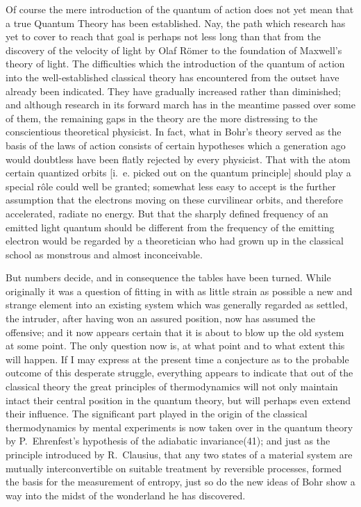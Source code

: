 \documentclass[12pt,oneside]{book}
\begin{document}
Of course the mere introduction of the quantum of action
does not yet mean that a true Quantum Theory has been
established. Nay, the path which research has yet to cover
to reach that goal is perhaps not less long than that from
the discovery of the velocity of light by Olaf R\"{o}mer to the
foundation of Maxwell's theory of light. The difficulties
which the introduction of the quantum of action into the
well-established classical theory has encountered from the
outset have already been indicated. They have gradually
increased rather than diminished; and although research
in its forward march has in the meantime passed over
some of them, the remaining gaps in the theory are the
more distressing to the conscientious theoretical physicist.
In fact, what in Bohr's theory served as the basis of the
laws of action consists of certain hypotheses which a generation
ago would doubtless have been flatly rejected by
every physicist. That with the atom certain quantized
orbits [i.~e. picked out on the quantum principle] should play
a special r\^{o}le could well be granted; somewhat less easy
to accept is the further assumption that the electrons
moving on these curvilinear orbits, and therefore accelerated,
radiate no energy. But that the sharply defined
frequency of an emitted light quantum should be different
from the frequency of the emitting electron would be regarded
by a theoretician who had grown up in the classical
school as monstrous and almost inconceivable.

But numbers decide, and in consequence the tables have
been turned. While originally it was a question of fitting
in with as little strain as possible a new and strange element
into an existing system which was generally regarded
as settled, the intruder, after having won an assured position,
now has assumed the offensive; and it now appears
certain that it is about to blow up the old system at some
point. The only question now is, at what point and to
what extent this will happen. If I may express at the
present time a conjecture as to the probable outcome of
this desperate struggle, everything appears to indicate that
out of the classical theory the great principles of thermodynamics
will not only maintain intact their central position
in the quantum theory, but will perhaps even extend their
influence. The significant part played in the origin of the
classical thermodynamics by mental experiments is now
taken over in the quantum theory by P.~Ehrenfest's hypothesis
of the adiabatic invariance(41); and just as the
principle introduced by R.~Clausius, that any two states of
a material system are mutually interconvertible on suitable
treatment by reversible processes, formed the basis for the
measurement of entropy, just so do the new ideas of Bohr
show a way into the midst of the wonderland he has
discovered.
\end{document}
